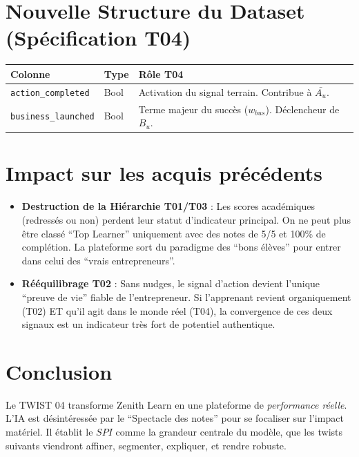 \documentclass[11pt,a4paper]{article}
\begin{document}
\section{Nouvelle Structure du Dataset (Spécification T04)}
\begin{table}[h!]
\centering
\begin{tabular}{|l|l|p{7cm}|}
\hline
\rowcolor{BrandDark} \color{white} Colonne & \rowcolor{BrandDark} \color{white} Type & \rowcolor{BrandDark} \color{white} Rôle T04 \\ \hline
\texttt{action\_completed} & Bool & Activation du signal terrain. Contribue à $\bar{A_u}$. \\ \hline
\texttt{business\_launched} & Bool & Terme majeur du succès ($w_{bus}$). Déclencheur de $B_u$. \\ \hline
\end{tabular}
\end{table}

\section{Impact sur les acquis précédents}
\begin{itemize}
    \item \textbf{Destruction de la Hiérarchie T01/T03} : Les scores académiques (redressés ou non) perdent leur statut d'indicateur principal. On ne peut plus être classé ``Top Learner'' uniquement avec des notes de 5/5 et 100\% de complétion. La plateforme sort du paradigme des ``bons élèves'' pour entrer dans celui des ``vrais entrepreneurs''.
    \item \textbf{Rééquilibrage T02} : Sans nudges, le signal d'action devient l'unique ``preuve de vie'' fiable de l'entrepreneur. Si l'apprenant revient organiquement (T02) ET qu'il agit dans le monde réel (T04), la convergence de ces deux signaux est un indicateur très fort de potentiel authentique.
\end{itemize}

\section{Conclusion}
Le TWIST 04 transforme Zenith Learn en une plateforme de \textit{performance réelle}. L'IA est désintéressée par le ``Spectacle des notes'' pour se focaliser sur l'impact matériel. Il établit le $SPI$ comme la grandeur centrale du modèle, que les twists suivants viendront affiner, segmenter, expliquer, et rendre robuste.
\end{document}
